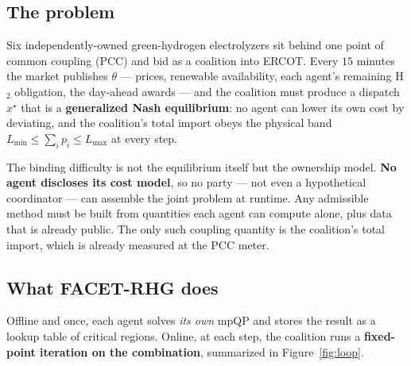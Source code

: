 \documentclass[11pt, letterpaper]{article}
\begin{document}
\subsection{The problem}
Six independently-owned green-hydrogen electrolyzers sit behind one point of common coupling (PCC) and
bid as a coalition into ERCOT. Every $15$ minutes the market publishes $\theta$ --- prices, renewable
availability, each agent's remaining H$_2$ obligation, the day-ahead awards --- and the coalition must
produce a dispatch $x^\star$ that is a \textbf{generalized Nash equilibrium}: no agent can lower its
own cost by deviating, and the coalition's total import obeys the physical band
$L_{\min}\le\sum_ip_i\le L_{\max}$ at every step.

The binding difficulty is not the equilibrium itself but the ownership model. \textbf{No agent
discloses its cost model}, so no party --- not even a hypothetical coordinator --- can assemble the
joint problem at runtime. Any admissible method must be built from quantities each agent can compute
alone, plus data that is already public. The only such coupling quantity is the coalition's total
import, which is already measured at the PCC meter.

\subsection{What FACET-RHG does}
Offline and once, each agent solves \emph{its own} mpQP and stores the result as a lookup table of
critical regions. Online, at each step, the coalition runs a \textbf{fixed-point iteration on the
combination}, summarized in Figure~\ref{fig:loop}.
\end{document}
